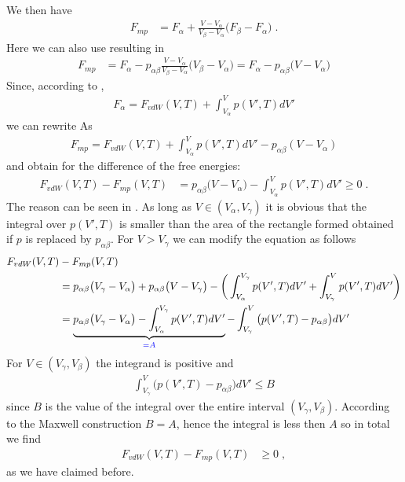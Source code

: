 %
We then have
%
\begin{align}\label{eq:F:mp:a}
F_{mp} &= 
 F_{\alpha} + \frac{V-V_{\alpha}}{V_{\beta}-V_{\alpha}} \big(F_{\beta}-F_{\alpha}\big)\;.
\end{align}
%
Here we can also use  resulting in
\begin{align}
F_{mp} &= 
 F_{\alpha}-p_{\alpha\beta} \frac{V-V_{\alpha}}{V_{\beta}-V_{\alpha}} \big(V_{\beta}-V_{\alpha}\big)
 =
 F_{\alpha} - p_{\alpha\beta} \big(V-V_{\alpha}\big)
\label{eq:F:mp}
\end{align}
Since, according to , 
\begin{align*}
F_\alpha = F_{vdW}(V,T) + \int_{V_\alpha}^{V} p(V',T) dV'
\end{align*}
we can rewrite  As
\begin{align*}
F_{mp} = F_{vdW}(V,T) + \int_{V_\alpha}^{V} p(V', T) dV' - p_{\alpha\beta}(V-V_\alpha)
\end{align*}
and obtain for the difference of the free energies:
%
\begin{align*}
F_{vdW}(V,T) - F_{mp}(V,T) &= 
p_{\alpha\beta} \big(V-V_{\alpha}\big) 
- \int_{V_{\alpha}}^{V} p(V',T) dV'  \ge 0 \;.
\end{align*}
%
The reason can be seen in . As long as $V\in(V_{\alpha},V_{\gamma})$
it is obvious that the integral over $p(V',T)$ is smaller than the area of the rectangle formed
obtained if $p$ is replaced by $p_{\alpha\beta}$. For $V> V_{\gamma}$ we can modify the equation as follows
\begin{align*}
F_{vdW}(V,T) &- F_{mp}(V,T)  \\
&=p_{\alpha\beta} \big(V_{\gamma}-V_{\alpha}\big) +
p_{\alpha\beta} \big(V-V_{\gamma}\big) 
- \bigg( \int_{V_{\alpha}}^{V_{\gamma}} p(V',T) dV'  + \int_{V_{\gamma}}^{V} p(V',T) dV' \bigg)\\
&= \underbrace{
p_{\alpha\beta} \big(V_{\gamma}-V_{\alpha}\big) -\int_{V_{\alpha}}^{V_{\gamma}} 
p(V',T) dV'}_{\color{blue} = A}
-     \int_{V_{\gamma}}^{V} \big(p(V',T)-p_{\alpha\beta}\big) dV'\\
\end{align*}
%
For $V \in (V_{\gamma},V_{\beta})$ the integrand  is positive and 
%
\begin{align*}
\int_{V_{\gamma}}^{V} \big(p(V',T)-p_{\alpha\beta}\big) dV' \le B
\end{align*}
%
since $B$ is the value of the integral over the entire interval $(V_{\gamma},V_{\beta})$.
According to the Maxwell construction $B=A$, hence the integral is less then $A$ so in total we find
\begin{align*}
F_{vdW}(V,T) - F_{mp}(V,T)  &\ge 0\;,
\end{align*}
%
as we have claimed before.

